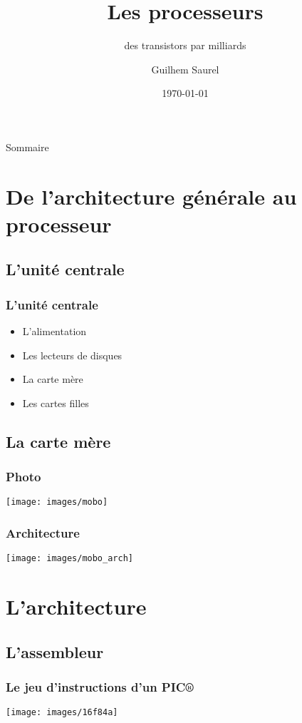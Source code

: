 \documentclass[slidetop,11pt]{beamer}
\title{Les processeurs}
\subtitle{des transistors par milliards}
\author{Guilhem Saurel}
\institute{ENSEEIHT}
\date{\today}
\begin{document}
\frame{\titlepage}

\begin{frame}{Sommaire}
    \small \tableofcontents
\end{frame} 

\section[L'ordinateur]{De l'architecture générale au processeur}
    \subsection[UC]{L'unité centrale}
        \begin{frame}
            \frametitle{L'unité centrale}
            \begin{itemize}
                \item L'alimentation
                \item Les lecteurs de disques
                \item La carte mère
                \item Les cartes filles
            \end{itemize}
        \end{frame}
 
    \subsection[MoBo]{La carte mère}
        \begin{frame}
            \frametitle{Photo}
            \begin{center}
                \texttt{[image: images/mobo]}
            \end{center}
        \end{frame}
 
        \begin{frame}
            \frametitle{Architecture}
            \begin{center}
                \texttt{[image: images/mobo\_arch]}
            \end{center}
        \end{frame}
 
 
\section[Arch]{L'architecture}
    \subsection[ASM]{L'assembleur}
        \begin{frame}
            \frametitle{Le jeu d'instructions d'un PIC®}
            \begin{center}
                \texttt{[image: images/16f84a]}
            \end{center}
        \end{frame}
  
\end{document}
